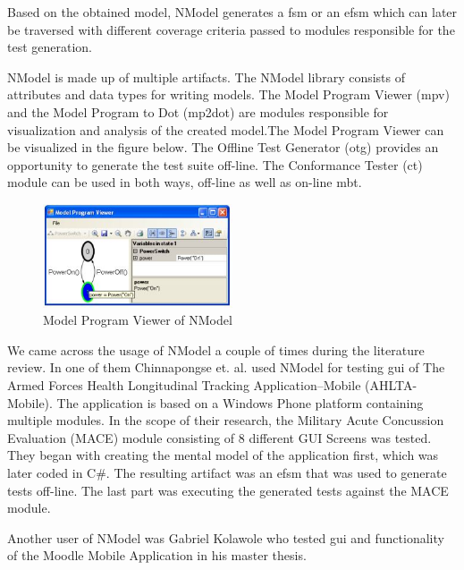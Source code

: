 \par
Based on the obtained model, NModel generates a \acrshort{fsm} or an \acrshort{efsm} which can later be traversed with different coverage criteria passed to modules responsible for the test generation.

\par
NModel is made up of multiple artifacts. The NModel library consists of attributes and data types for writing models. The Model Program Viewer (mpv) and the Model Program to Dot (mp2dot) are modules responsible for visualization and analysis of the created model.The Model Program Viewer can be visualized in the figure below. The Offline Test Generator (otg) provides an opportunity to generate the test suite off-line. The Conformance Tester (ct) module can be used in both ways, off-line as well as on-line \acrshort{mbt}.

\begin{figure} [htbp!]
	\centering
					\includegraphics[width=0.5\textwidth]{figures/NModel_mpv.JPG}
					\caption{\label{Fig:NModel_mpv} Model Program Viewer of NModel}
\end{figure}


\par
We came across the usage of NModel a couple of times during the literature review. In one of them Chinnapongse et. al. \cite{Chinnapongse_NModel} used NModel for testing \acrshort{gui} of The Armed Forces Health Longitudinal Tracking Application–Mobile (AHLTA-Mobile). The application is based on a Windows Phone platform containing multiple modules. In the scope of their research, the Military Acute Concussion Evaluation (MACE) module consisting of 8 different GUI Screens was tested. They began with creating the mental model of the application first, which was later coded in C\#. The resulting artifact was an \acrshort{efsm} that was used to generate tests off-line. The last part was executing the generated tests against the MACE module.
\par
Another user of NModel was Gabriel Kolawole \cite{Kolawole_NModel} who tested \acrshort{gui} and functionality of the Moodle Mobile Application in his master thesis.

